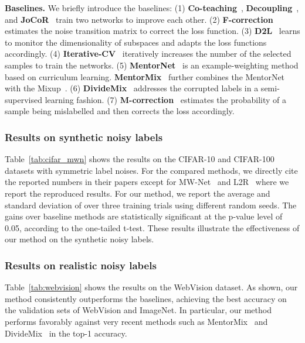 \documentclass[final]{cvpr}
\begin{document}
\textbf{Baselines.} We briefly introduce the baselines:
(1) \textbf{Co-teaching}~\cite{han2018co}, \textbf{Decoupling}~\cite{malach2017decoupling}, and \textbf{JoCoR}~\cite{wei2020combating} train two networks to improve each other.
(2) \textbf{F-correction}~\cite{patrini2017making} estimates the noise transition matrix to correct the loss function. 
(3) \textbf{D2L}~\cite{ma2018dimensionality} learns to monitor the dimensionality of subspaces and adapts the loss functions accordingly. 
(4) \textbf{Iterative-CV}~\cite{chen2019understanding} iteratively increases the number of the selected samples to train the networks. 
(5) \textbf{MentorNet}~\cite{jiang2017mentornet} is an example-weighting method based on curriculum learning. \textbf{MentorMix}~\cite{jiang2020beyond} further combines the MentorNet with the Mixup~\cite{zhang2017mixup}. 
(6) \textbf{DivideMix}~\cite{li2020dividemix} addresses the corrupted labels in a semi-supervised learning fashion.
(7) \textbf{M-correction}~\cite{arazo2019unsupervised} estimates the probability of a sample being mislabelled and then corrects the loss accordingly.





\subsubsection{Results on synthetic noisy labels}
Table~\ref{tab:cifar_mwn} shows the results on the CIFAR-10 and CIFAR-100 datasets with symmetric label noises. 
For the compared methods, we directly cite the reported numbers in their papers except for MW-Net~\cite{shu2019meta} and L2R~\cite{ren2018learning} where we report the reproduced results. For our method, we report the average and standard deviation of over three training trials using different random seeds.
The gains over baseline methods are statistically significant at the p-value level of 0.05, according to the one-tailed t-test.
These results illustrate the effectiveness of our method on the synthetic noisy labels.




\subsubsection{Results on realistic noisy labels}

Table~\ref{tab:webvision} shows the results on the WebVision dataset. As shown, our method consistently outperforms the baselines, achieving the best accuracy on the validation sets of WebVision and ImageNet. 
In particular, our method performs favorably against very recent methods such as MentorMix~\cite{jiang2020beyond} and DivideMix~\cite{li2020dividemix} in the top-1 accuracy.
\end{document}
